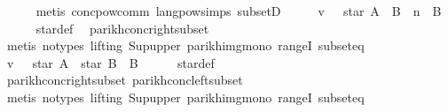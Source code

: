 \begin{isabellebody}
\ \ \ \ \isamarkupfalse%
\ {\isacharparenleft}{\kern0pt}metis\ conc{\isacharunderscore}{\kern0pt}pow{\isacharunderscore}{\kern0pt}comm\ lang{\isacharunderscore}{\kern0pt}pow{\isachardot}{\kern0pt}simps{\isacharparenleft}{\kern0pt}{}{\isacharparenright}{\kern0pt}\ subsetD{\isacharparenright}{\kern0pt}\isanewline
\ \ \isamarkupfalse%
\ \isamarkupfalse%
\ {\isachardoublequoteopen}v\ {\isasymin}\ {\isasymPsi}\ {\isacharparenleft}{\kern0pt}star\ A\ {\isacharat}{\kern0pt}{\isacharat}{\kern0pt}\ B\ {\isacharcircum}{\kern0pt}{\isacharcircum}{\kern0pt}\ n\ {\isacharat}{\kern0pt}{\isacharat}{\kern0pt}\ B{\isacharparenright}{\kern0pt}{\isachardoublequoteclose}\isanewline
\ \ \ \ \isamarkupfalse%
\ star{\isacharunderscore}{\kern0pt}def\ \isamarkupfalse%
\ parikh{\isacharunderscore}{\kern0pt}conc{\isacharunderscore}{\kern0pt}right{\isacharunderscore}{\kern0pt}subset\isanewline
\ \ \ \ \isamarkupfalse%
\ {\isacharparenleft}{\kern0pt}metis\ {\isacharparenleft}{\kern0pt}no{\isacharunderscore}{\kern0pt}types{\isacharcomma}{\kern0pt}\ lifting{\isacharparenright}{\kern0pt}\ Sup{\isacharunderscore}{\kern0pt}upper\ parikh{\isacharunderscore}{\kern0pt}img{\isacharunderscore}{\kern0pt}mono\ rangeI\ subset{\isacharunderscore}{\kern0pt}eq{\isacharparenright}{\kern0pt}\isanewline
\ \ \isamarkupfalse%
\ \isamarkupfalse%
\ {\isachardoublequoteopen}v\ {\isasymin}\ {\isasymPsi}\ {\isacharparenleft}{\kern0pt}star\ A\ {\isacharat}{\kern0pt}{\isacharat}{\kern0pt}\ star\ B\ {\isacharat}{\kern0pt}{\isacharat}{\kern0pt}\ B{\isacharparenright}{\kern0pt}{\isachardoublequoteclose}\isanewline
\ \ \ \ \isamarkupfalse%
\ star{\isacharunderscore}{\kern0pt}def\ \isamarkupfalse%
\ parikh{\isacharunderscore}{\kern0pt}conc{\isacharunderscore}{\kern0pt}right{\isacharunderscore}{\kern0pt}subset\ parikh{\isacharunderscore}{\kern0pt}conc{\isacharunderscore}{\kern0pt}left{\isacharunderscore}{\kern0pt}subset\isanewline
\ \ \ \ \isamarkupfalse%
\ {\isacharparenleft}{\kern0pt}metis\ {\isacharparenleft}{\kern0pt}no{\isacharunderscore}{\kern0pt}types{\isacharcomma}{\kern0pt}\ lifting{\isacharparenright}{\kern0pt}\ Sup{\isacharunderscore}{\kern0pt}upper\ parikh{\isacharunderscore}{\kern0pt}img{\isacharunderscore}{\kern0pt}mono\ rangeI\ subset{\isacharunderscore}{\kern0pt}eq{\isacharparenright}{\kern0pt}\isanewline
{}\isamarkupfalse%
%
\endisatagproof
{\isafoldproof}%

\end{isabellebody}
